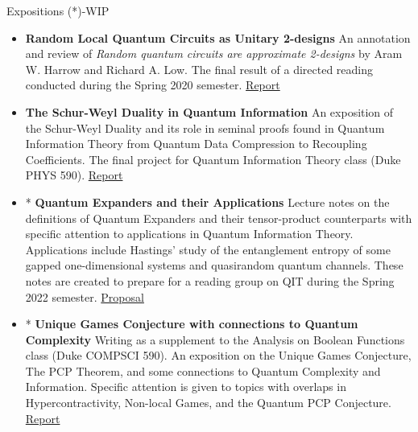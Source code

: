 \documentclass{resume} %
\begin{document}
\begin{rSection}{Expositions} (*)-WIP
  \begin{itemize}[leftmargin=*]

    \item {\bf Random Local Quantum Circuits as Unitary 2-designs} \hfill \newline
     An annotation and review of \textit{Random quantum circuits are approximate 2-designs} by Aram W. Harrow and Richard A. Low. The final result of a directed reading conducted during the Spring 2020 semester.
    \href{https://github.com/ekim1919/Research/blob/master/PHYS790/final.pdf}{Report}

    \item {\bf The Schur-Weyl Duality in Quantum Information} \hfill \hfill \newline
    An exposition of the Schur-Weyl Duality and its role in seminal proofs found in Quantum Information Theory from Quantum Data Compression to Recoupling Coefficients. The final project for Quantum Information Theory class (Duke PHYS 590).
    \href{https://github.com/ekim1919/Research/blob/master/P590/final.pdf}{Report}

    \item * {\bf Quantum Expanders and their Applications} \hfill \newline
      Lecture notes on the definitions of Quantum Expanders and their tensor-product counterparts with specific attention to applications in Quantum Information Theory. Applications include Hastings' study of the entanglement entropy of some gapped one-dimensional systems and quasirandom quantum channels. These notes are created to prepare for a reading group on QIT during the Spring 2022 semester. \href{https://ekim1919.github.io/files/QEProposal.pdf}{Proposal}
    \item * {\bf Unique Games Conjecture with connections to Quantum Complexity} \hfill \newline
    Writing as a supplement to the Analysis on Boolean Functions class (Duke COMPSCI 590). An exposition on the Unique Games Conjecture, The PCP Theorem, and some connections to Quantum Complexity and Information. Specific attention is given to topics with overlaps in Hypercontractivity, Non-local Games, and the Quantum PCP Conjecture. \href{https://github.com/ekim1919/Research/blob/master/Complexity/UGC/ugc.pdf}{Report}


\end{itemize}
\end{rSection}
\end{document}
